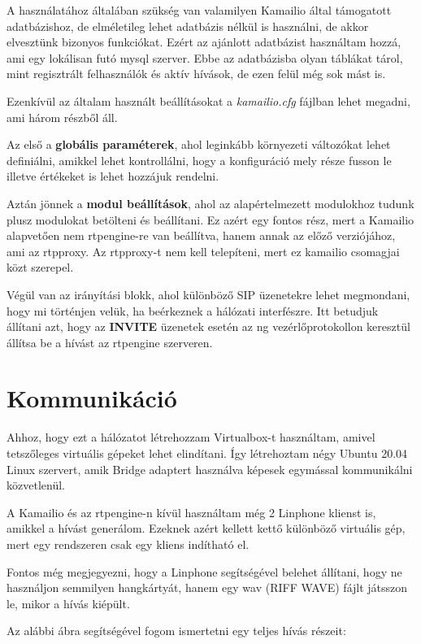 A használatához általában szükség van valamilyen Kamailio által támogatott adatbázishoz,
de elméletileg lehet adatbázis nélkül is használni, de akkor elvesztünk bizonyos funkciókat. 
Ezért az ajánlott adatbázist használtam hozzá, ami egy lokálisan futó mysql szerver. Ebbe 
az adatbázisba olyan táblákat tárol, mint regisztrált felhasználók és aktív hívások, de 
ezen felül még sok mást is. 

Ezenkívül az általam használt beállításokat a \textit{kamailio.cfg} fájlban lehet megadni,
ami három részből áll. 

Az első a \textbf{globális paraméterek}, ahol leginkább környezeti változókat lehet 
definiálni, amikkel lehet kontrollálni, hogy a konfiguráció mely része fusson le illetve
értékeket is lehet hozzájuk rendelni. 

Aztán jönnek a \textbf{modul beállítások}, ahol az alapértelmezett modulokhoz tudunk plusz
modulokat betölteni és beállítani. Ez azért egy fontos rész, mert a Kamailio alapvetően 
nem rtpengine-re van beállítva, hanem annak az előző verziójához, ami az rtpproxy. 
Az rtpproxy-t nem kell telepíteni, mert ez kamailio csomagjai közt szerepel. 

Végül van az irányítási blokk, ahol különböző SIP üzenetekre lehet megmondani, hogy mi
történjen velük, ha beérkeznek a hálózati interfészre. Itt betudjuk állítani azt, hogy
az \textbf{INVITE} üzenetek esetén az ng vezérlőprotokollon keresztül állítsa be a hívást
az rtpengine szerveren.

\section{Kommunikáció}

Ahhoz, hogy ezt a hálózatot létrehozzam Virtualbox-t használtam, amivel tetszőleges 
virtuális gépeket lehet elindítani. Így létrehoztam négy Ubuntu 20.04 Linux szervert, amik
Bridge adaptert használva képesek egymással kommunikálni közvetlenül. 

A Kamailio és az rtpengine-n kívül használtam még 2 Linphone klienst is, amikkel a hívást
generálom. Ezeknek azért kellett kettő különböző virtuális gép, mert egy rendszeren 
csak egy kliens indítható el.

Fontos még megjegyezni, hogy a Linphone segítségével belehet állítani, hogy ne használjon
semmilyen hangkártyát, hanem egy wav (RIFF WAVE) fájlt játsszon le, mikor a hívás kiépült.

Az alábbi ábra segítségével fogom ismertetni egy teljes hívás részeit:

